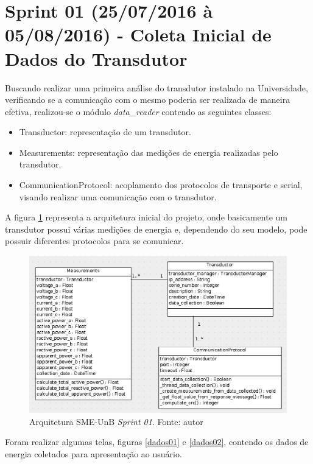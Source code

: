 \section{Sprint 01 (25/07/2016 à 05/08/2016) - Coleta Inicial de Dados do Transdutor}
Buscando realizar uma primeira análise do transdutor instalado na Universidade, verificando se a comunicação com o mesmo poderia ser realizada de maneira efetiva, realizou-se o módulo \textit{data\_reader} contendo as seguintes classes:
\begin{itemize}
    \item Transductor: representação de um transdutor.
    \item Measurements: representação das medições de energia realizadas pelo transdutor.
    \item CommunicationProtocol: acoplamento dos protocolos de transporte e serial, visando realizar uma comunicação com o transdutor.
\end{itemize}

A figura \ref{sprint01arq} representa a arquitetura inicial do projeto, onde basicamente um transdutor possui várias medições de energia e, dependendo do seu modelo, pode possuir diferentes protocolos para se comunicar.

\begin{figure}[!htpb]
    \centering
    \includegraphics[keepaspectratio=true,scale=0.6]{figuras/sprint01arq.eps}
    \caption{Arquitetura SME-UnB \textit{Sprint 01}. Fonte: autor}
    \label{sprint01arq}
\end{figure}

\vfill
\pagebreak

Foram realizar algumas telas, figuras \ref{dados01} e \ref{dados02}, contendo os dados de energia coletados para apresentação ao usuário.


